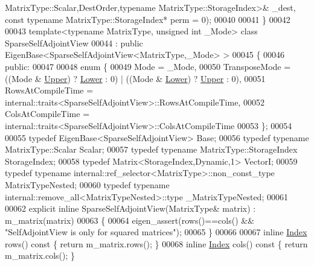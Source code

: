 \begin{DoxyCode}
       MatrixType::Scalar,DestOrder,typename MatrixType::StorageIndex>& \_dest, \textcolor{keyword}{const} \textcolor{keyword}{typename} MatrixType::StorageIndex* perm = 0);
00040 
00041 \}
00042 
00043 \textcolor{keyword}{template}<\textcolor{keyword}{typename} MatrixType, \textcolor{keywordtype}{unsigned} \textcolor{keywordtype}{int} \_Mode> \textcolor{keyword}{class }SparseSelfAdjointView
00044   : \textcolor{keyword}{public} EigenBase<SparseSelfAdjointView<MatrixType,\_Mode> >
00045 \{
00046   \textcolor{keyword}{public}:
00047     
00048     \textcolor{keyword}{enum} \{
00049       Mode = \_Mode,
00050       TransposeMode = ((Mode & \hyperlink{group__enums_gga39e3366ff5554d731e7dc8bb642f83cda6bcb58be3b8b8ec84859ce0c5ac0aaec}{Upper}) ? \hyperlink{group__enums_gga39e3366ff5554d731e7dc8bb642f83cda891792b8ed394f7607ab16dd716f60e6}{Lower} : 0) | ((Mode & \hyperlink{group__enums_gga39e3366ff5554d731e7dc8bb642f83cda891792b8ed394f7607ab16dd716f60e6}{Lower}) ? 
      \hyperlink{group__enums_gga39e3366ff5554d731e7dc8bb642f83cda6bcb58be3b8b8ec84859ce0c5ac0aaec}{Upper} : 0),
00051       RowsAtCompileTime = internal::traits<SparseSelfAdjointView>::RowsAtCompileTime,
00052       ColsAtCompileTime = internal::traits<SparseSelfAdjointView>::ColsAtCompileTime
00053     \};
00054 
00055     \textcolor{keyword}{typedef} EigenBase<SparseSelfAdjointView> Base;
00056     \textcolor{keyword}{typedef} \textcolor{keyword}{typename} MatrixType::Scalar Scalar;
00057     \textcolor{keyword}{typedef} \textcolor{keyword}{typename} MatrixType::StorageIndex StorageIndex;
00058     \textcolor{keyword}{typedef} Matrix<StorageIndex,Dynamic,1> VectorI;
00059     \textcolor{keyword}{typedef} \textcolor{keyword}{typename} internal::ref\_selector<MatrixType>::non\_const\_type MatrixTypeNested;
00060     \textcolor{keyword}{typedef} \textcolor{keyword}{typename} internal::remove\_all<MatrixTypeNested>::type \_MatrixTypeNested;
00061     
00062     \textcolor{keyword}{explicit} \textcolor{keyword}{inline} SparseSelfAdjointView(MatrixType& matrix) : m\_matrix(matrix)
00063     \{
00064       eigen\_assert(rows()==cols() && \textcolor{stringliteral}{"SelfAdjointView is only for squared matrices"});
00065     \}
00066 
00067     \textcolor{keyword}{inline} \hyperlink{namespace_eigen_a62e77e0933482dafde8fe197d9a2cfde}{Index} rows()\textcolor{keyword}{ const }\{ \textcolor{keywordflow}{return} m\_matrix.rows(); \}
00068     \textcolor{keyword}{inline} \hyperlink{namespace_eigen_a62e77e0933482dafde8fe197d9a2cfde}{Index} cols()\textcolor{keyword}{ const }\{ \textcolor{keywordflow}{return} m\_matrix.cols(); \}

\end{DoxyCode}
